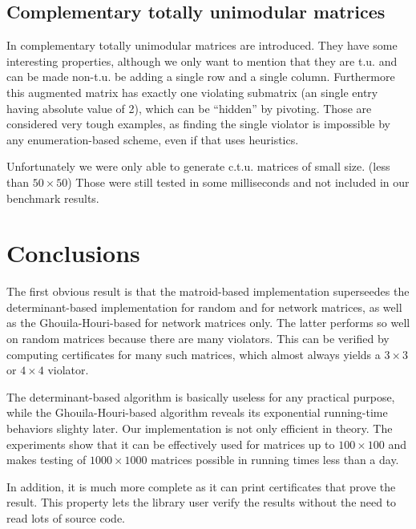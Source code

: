 \documentclass[12pt]{article}
\begin{document}
\subsection{Complementary totally unimodular matrices}

In \cite{Truemper98} complementary totally unimodular matrices are introduced. They have some interesting properties, although we only want to mention that they are t.u. and
can be made non-t.u. be adding a single row and a single column. Furthermore this augmented matrix has exactly one violating submatrix (an single entry having absolute value of 2),
which can be ``hidden'' by pivoting. Those are considered very tough examples, as finding the single violator is impossible by any enumeration-based scheme, even if that uses heuristics.

Unfortunately we were only able to generate c.t.u. matrices of small size. (less than $50 \times 50$) Those were still tested in some milliseconds and not included in our benchmark results.

\section{Conclusions}

The first obvious result is that the matroid-based implementation superseedes the determinant-based implementation for random and for network matrices,
as well as the Ghouila-Houri-based for network matrices only.
The latter performs so well on random matrices because there are many violators.
This can be verified by computing certificates for many such matrices, which almost always yields a $3 \times 3$ or $4 \times 4$ violator.

The determinant-based algorithm is basically useless for any practical purpose, while the Ghouila-Houri-based algorithm reveals its exponential running-time behaviors slighty later.
Our implementation is not only efficient in theory. The experiments show that it can be effectively used for matrices up to $100 \times 100$ and makes testing of $1000 \times 1000$ matrices
possible in running times less than a day.

In addition, it is much more complete as it can print certificates that prove the result. This property lets the library user verify the results without the need to read lots of source code.



\end{document}
